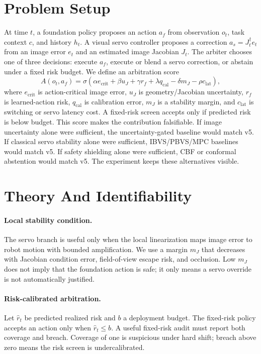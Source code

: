 \documentclass{article}
\begin{document}
\section{Problem Setup}
At time $t$, a foundation policy proposes an action $a_f$ from observation $o_t$, task context $c$, and history $h_t$. A visual servo controller proposes a correction $a_s = J_t^\dagger e_t$ from an image error $e_t$ and an estimated image Jacobian $J_t$. The arbiter chooses one of three decisions: execute $a_f$, execute or blend a servo correction, or abstain under a fixed risk budget.
We define an arbitration score
\[
A(o_t,a_f)=\sigma\left(\alpha e_{\mathrm{crit}} + \beta u_J + \gamma r_f + \lambda q_{\mathrm{cal}} - \delta m_J - \rho c_{\mathrm{lat}}\right),
\]
where $e_{\mathrm{crit}}$ is action-critical image error, $u_J$ is geometry/Jacobian uncertainty, $r_f$ is learned-action risk, $q_{\mathrm{cal}}$ is calibration error, $m_J$ is a stability margin, and $c_{\mathrm{lat}}$ is switching or servo latency cost. A fixed-risk screen accepts only if predicted risk is below budget.
This score makes the contribution falsifiable. If image uncertainty alone were sufficient, the uncertainty-gated baseline would match v5. If classical servo stability alone were sufficient, IBVS/PBVS/MPC baselines would match v5. If safety shielding alone were sufficient, CBF or conformal abstention would match v5. The experiment keeps these alternatives visible.
\section{Theory And Identifiability}
\paragraph{Local stability condition.} The servo branch is useful only when the local linearization maps image error to robot motion with bounded amplification. We use a margin $m_J$ that decreases with Jacobian condition error, field-of-view escape risk, and occlusion. Low $m_J$ does not imply that the foundation action is safe; it only means a servo override is not automatically justified.
\paragraph{Risk-calibrated arbitration.} Let $\hat r_t$ be predicted realized risk and $b$ a deployment budget. The fixed-risk policy accepts an action only when $\hat r_t \le b$. A useful fixed-risk audit must report both coverage and breach. Coverage of one is suspicious under hard shift; breach above zero means the risk screen is undercalibrated.
\end{document}
